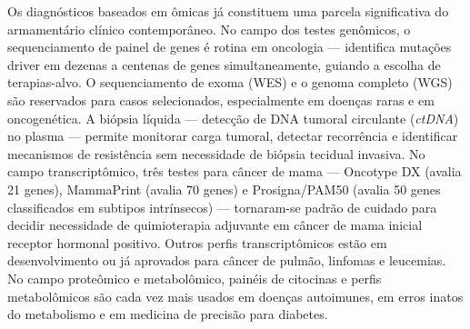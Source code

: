 Os diagnósticos baseados em ômicas já constituem uma parcela significativa do armamentário clínico contemporâneo. No campo dos testes genômicos, o sequenciamento de painel de genes é rotina em oncologia --- identifica mutações driver em dezenas a centenas de genes simultaneamente, guiando a escolha de terapias-alvo. O sequenciamento de exoma (WES) e o genoma completo (WGS) são reservados para casos selecionados, especialmente em doenças raras e em oncogenética. A biópsia líquida --- detecção de DNA tumoral circulante (\emph{ctDNA}) no plasma --- permite monitorar carga tumoral, detectar recorrência e identificar mecanismos de resistência sem necessidade de biópsia tecidual invasiva. No campo transcriptômico, três testes para câncer de mama --- Oncotype DX (avalia 21 genes), MammaPrint (avalia 70 genes) e Prosigna/PAM50 (avalia 50 genes classificados em subtipos intrínsecos) --- tornaram-se padrão de cuidado para decidir necessidade de quimioterapia adjuvante em câncer de mama inicial receptor hormonal positivo. Outros perfis transcriptômicos estão em desenvolvimento ou já aprovados para câncer de pulmão, linfomas e leucemias. No campo proteômico e metabolômico, painéis de citocinas e perfis metabolômicos são cada vez mais usados em doenças autoimunes, em erros inatos do metabolismo e em medicina de precisão para diabetes.



